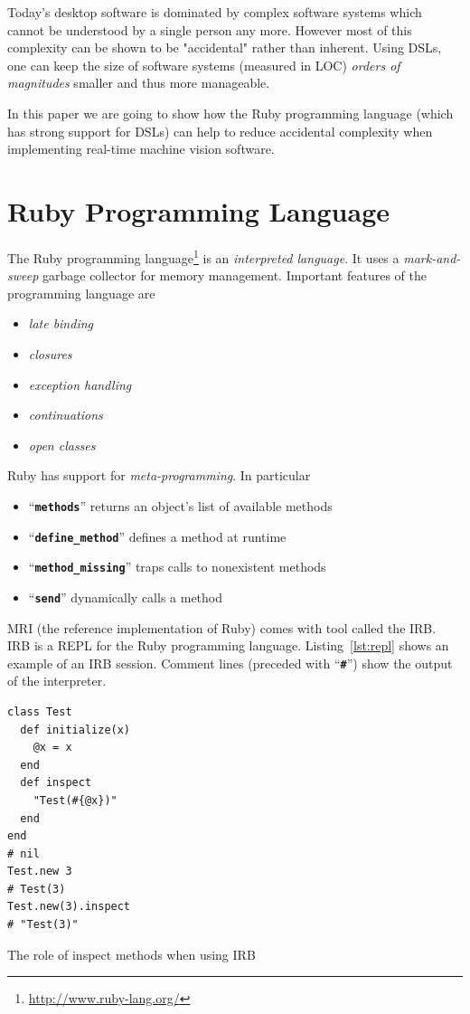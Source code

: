\documentclass[10pt,journal,compsoc]{joser13}
\newcommand{\code}[1]{``\texttt{\textbf{\textcolor{codegray}{\small{#1}}}}''}
\newcommand{\lst}[1]{Listing~\ref{lst:#1}}
\begin{document}
Today's desktop software is dominated by complex software systems which cannot
be understood by a single person any more. However most of this complexity can
be shown to be "accidental" rather than inherent\citep{ohshima2013kscript}.
Using \acp{DSL}, one can keep the size of software systems (measured in LOC)
\emph{orders of magnitudes} smaller and thus more
manageable\citep{kay2010steps}.

In this paper we are going to show how the Ruby programming language (which has
strong support for DSLs) can help to reduce accidental complexity when
implementing real-time machine vision software.

\section{Ruby Programming Language}
The Ruby programming language\footnote{\url{http://www.ruby-lang.org/}} is an
\emph{interpreted language}. It uses a \emph{mark-and-sweep} garbage collector
for memory management. Important features of the programming language are
\begin{itemize}
  \item \emph{late binding}
  \item \emph{closures}
  \item \emph{exception handling}
  \item \emph{continuations}
  \item \emph{open classes}
\end{itemize}

Ruby has support for \emph{meta-programming}. In particular
\begin{itemize}
  \item \code{methods} returns an object's list of available methods
  \item \code{define\_method} defines a method at runtime
  \item \code{method\_missing} traps calls to nonexistent methods
  \item \code{send} dynamically calls a method
\end{itemize}

\ac{MRI} (the reference implementation of Ruby) comes with tool called the
\ac{IRB}. \ac{IRB} is a \ac{REPL} for the Ruby programming language. \lst{repl}
shows an example of an \ac{IRB} session. Comment lines (preceded with \code{\#}) show the output of the interpreter.
\begin{listing}[htbp]
  \begin{verbatim}
class Test
  def initialize(x)
    @x = x
  end
  def inspect
    "Test(#{@x})"
  end
end
# nil
Test.new 3
# Test(3)
Test.new(3).inspect
# "Test(3)"
  \end{verbatim}
  \caption{The role of inspect methods when using IRB\label{lst:repl}}
\end{listing}
\end{document}
